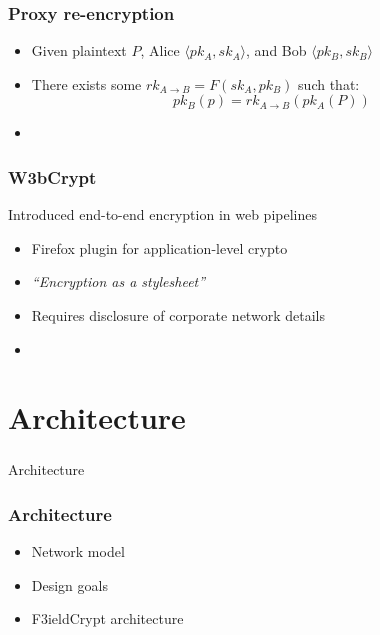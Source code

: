 \documentclass{beamer}
\begin{document}

\begin{frame}
\frametitle{Proxy re-encryption}
\begin{itemize}
\item Given plaintext $P$, Alice $\langle pk_A, sk_A \rangle$, and Bob
$\langle pk_B, sk_B \rangle$
\item There exists some $rk_{A \to B} = F(sk_A, pk_B)$ such that:
\begin{equation*}
pk_B(p) = rk_{A \to B}( pk_A (P))
\end{equation*}
\item \cite{atomic_proxy_reencryption} 
\end{itemize}
\end{frame}

\begin{frame}
\frametitle{W3bCrypt}
Introduced end-to-end encryption in web pipelines
\smallskip
\begin{itemize}
\item Firefox plugin for application-level crypto
\item \emph{``Encryption as a stylesheet''}
\item Requires disclosure of corporate network details
\item \cite{w3bcrypt} 
\end{itemize}
\end{frame}

\section{Architecture}
\begin{frame}
\frametitle{}
\begin{center}
Architecture
\end{center}
\end{frame}

\begin{frame}
\frametitle{Architecture}
\begin{itemize}
\item Network model
\item Design goals
\item F3ieldCrypt architecture
\end{itemize}
\end{frame}
\end{document}
